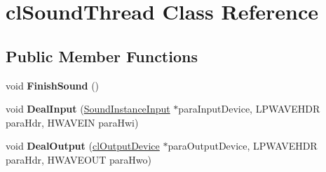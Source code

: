 \hypertarget{classcl_sound_thread}{
\section{clSoundThread Class Reference}
\label{classcl_sound_thread}
}
\subsection*{Public Member Functions}
\begin{DoxyCompactItemize}
\item 
\hypertarget{classcl_sound_thread_ab8640eb1de32c387e003f3aef5188a47}{
void {\bfseries FinishSound} ()}
\label{classcl_sound_thread_ab8640eb1de32c387e003f3aef5188a47}

\item 
\hypertarget{classcl_sound_thread_af3714b7aec9d306b454f40b3c99772b6}{
void {\bfseries DealInput} (\hyperlink{class_sound_instance_input}{SoundInstanceInput} $\ast$paraInputDevice, LPWAVEHDR paraHdr, HWAVEIN paraHwi)}
\label{classcl_sound_thread_af3714b7aec9d306b454f40b3c99772b6}

\item 
\hypertarget{classcl_sound_thread_ae5e310abc7ecceb703f15bd16c938d5b}{
void {\bfseries DealOutput} (\hyperlink{classcl_output_device}{clOutputDevice} $\ast$paraOutputDevice, LPWAVEHDR paraHdr, HWAVEOUT paraHwo)}
\label{classcl_sound_thread_ae5e310abc7ecceb703f15bd16c938d5b}

\end{DoxyCompactItemize}
